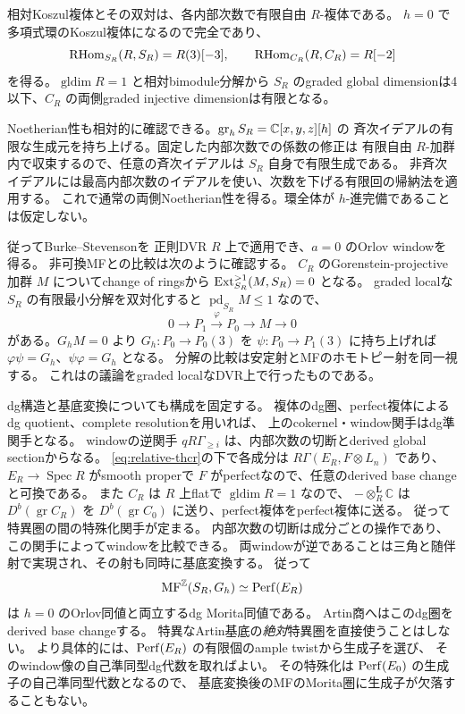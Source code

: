 相対Koszul複体とその双対は、各内部次数で有限自由 $R$-複体である。
$h=0$ で多項式環のKoszul複体になるので完全であり、
\[
 \operatorname{RHom}_{S_R}(R,S_R)=R(3)[-3],\qquad
 \operatorname{RHom}_{C_R}(R,C_R)=R[-2]
\]
を得る。$\operatorname{gldim}R=1$ と相対bimodule分解から
$S_R$ のgraded global dimensionは4以下、$C_R$ の両側graded injective dimensionは有限となる。

Noetherian性も相対的に確認できる。$\operatorname{gr}_hS_R=\mathbb C[x,y,z][h]$ の
斉次イデアルの有限な生成元を持ち上げる。固定した内部次数での係数の修正は
有限自由 $R$-加群内で収束するので、任意の斉次イデアルは $S_R$ 自身で有限生成である。
非斉次イデアルには最高内部次数のイデアルを使い、次数を下げる有限回の帰納法を適用する。
これで通常の両側Noetherian性を得る。環全体が $h$-進完備であることは仮定しない。

従ってBurke--Stevenson\cite[Definition 5.1, Lemma 6.2, Theorem 6.4(3)]{BS}を
正則DVR $R$ 上で適用でき、$a=0$ のOrlov windowを得る。
非可換MFとの比較は次のように確認する。
$C_R$ のGorenstein-projective加群 $M$ についてchange of ringsから
$\operatorname{Ext}^{>1}_{S_R}(M,S_R)=0$ となる。
graded localな $S_R$ の有限最小分解を双対化すると
$\operatorname{pd}_{S_R}M\le1$ なので、
\[
 0\to P_1\xrightarrow\varphi P_0\to M\to0
\]
がある。$G_hM=0$ より $G_h:P_0\to P_0(3)$ を $\psi:P_0\to P_1(3)$ に持ち上げれば
$\varphi\psi=G_h$、$\psi\varphi=G_h$ となる。
分解の比較は安定射とMFのホモトピー射を同一視する。
これは\cite{CCKM}の議論をgraded localなDVR上で行ったものである。

dg構造と基底変換についても構成を固定する。
複体のdg圏、perfect複体によるdg quotient、complete resolutionを用いれば、
上のcokernel・window関手はdg準関手となる。
windowの逆関手 $qR\Gamma_{\ge i}$ は、内部次数の切断とderived global sectionからなる。
\eqref{eq:relative-thcr}の下で各成分は
$R\Gamma(E_R,F\otimes L_n)$ であり、$E_R\to\operatorname{Spec}R$ がsmooth properで
$F$ がperfectなので、任意のderived base changeと可換である。
また $C_R$ は $R$ 上flatで $\operatorname{gldim}R=1$ なので、
$-\otimes_R^{\mathbf L}\mathbb C$ は $D^b(\operatorname{gr}C_R)$ を
$D^b(\operatorname{gr}C_0)$ に送り、perfect複体をperfect複体に送る。
従って特異圏の間の特殊化関手が定まる。
内部次数の切断は成分ごとの操作であり、この関手によってwindowを比較できる。
両windowが逆であることは三角と随伴射で実現され、その射も同時に基底変換する。
従って
\[
 \operatorname{MF}^{\mathbb Z}(S_R,G_h)\simeq\operatorname{Perf}(E_R)
\]
は $h=0$ のOrlov同値と両立するdg Morita同値である。
Artin商へはこのdg圏をderived base changeする。
特異なArtin基底の\emph{絶対}特異圏を直接使うことはしない。
より具体的には、$\operatorname{Perf}(E_R)$ の有限個のample twistから生成子を選び、
そのwindow像の自己準同型dg代数を取ればよい。
その特殊化は $\operatorname{Perf}(E_0)$ の生成子の自己準同型代数となるので、
基底変換後のMFのMorita圏に生成子が欠落することもない。

